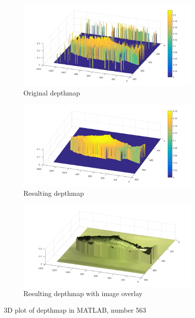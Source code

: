 \begin{figure}[H]
    \centering
    \begin{subfigure}{1\textwidth}
        \centering
        \includegraphics[width=.85\linewidth]{images/results/3D_plots/original_3D_63}
        \caption{Original depthmap} 
        \label{fig:3D_original_63}
    \end{subfigure}\hspace*{\fill}
    
    \medskip
    \begin{subfigure}{1\textwidth}
        \centering
        \includegraphics[width=.85\linewidth]{images/results/3D_plots/fixed_3D_63}
        \caption{Resulting depthmap} 
        \label{fig:3D_fixed_63}
    \end{subfigure}\hspace*{\fill}
    
    \medskip
    \begin{subfigure}{1\textwidth}
        \centering
        \includegraphics[width=.85\linewidth]{images/results/3D_plots/fixed_3D_fish_63}
        \caption{Resulting depthmap with image overlay} 
        \label{fig:3D_fixed_fish_63}
    \end{subfigure}\hspace*{\fill}
    \caption{3D plot of depthmap in MATLAB, number 563}
    \label{fig:3D_plot_63}
\end{figure}



